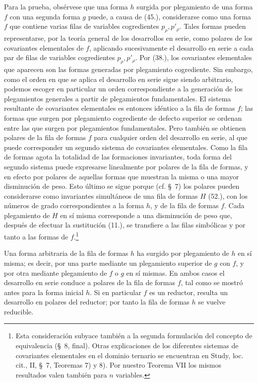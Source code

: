 \documentclass[11pt]{article}
\begin{document}
Para la prueba, obsérvese que una forma $h$ surgida por plegamiento de una forma $f$ con una segunda forma $g$ puede, a causa de (45.), considerarse como una forma $f$ que contiene varias filas de variables cogredientes $p_\rho,p'_\rho$. Tales formas pueden representarse, por la teoría general de los desarrollos en serie, como polares de los covariantes elementales de $f$, aplicando sucesivamente el desarrollo en serie a cada par de filas de variables cogredientes $p_\rho,p'_\rho$. Por (38.), los covariantes elementales que aparecen son las formas generadas por plegamiento cogrediente. Sin embargo, como el orden en que se aplica el desarrollo en serie sigue siendo arbitrario, podemos escoger en particular un orden correspondiente a la generación de los plegamientos generales a partir de plegamientos fundamentales. El sistema resultante de covariantes elementales es entonces idéntico a la fila de formas $f$; las formas que surgen por plegamiento cogrediente de defecto superior se ordenan entre las que surgen por plegamientos fundamentales. Pero también se obtienen polares de la fila de formas $f$ para cualquier orden del desarrollo en serie, al que puede corresponder un segundo sistema de covariantes elementales. Como la fila de formas agota la totalidad de las formaciones invariantes, toda forma del segundo sistema puede expresarse linealmente por polares de la fila de formas, y en efecto por polares de aquellas formas que muestran la misma o una mayor disminución de peso. Esto último se sigue porque (cf. \S\ 7) los polares pueden considerarse como invariantes simultáneos de una fila de formas $H$ (52.), con los números de grado correspondientes a la forma $h$, y de la fila de formas $f$. Cada plegamiento de $H$ en sí misma corresponde a una disminución de peso que, después de efectuar la sustitución (11.), se transfiere a las filas simbólicas y por tanto a las formas de $f$.\footnote{Esta consideración subyace también a la segunda formulación del concepto de equivalencia (\S\ 8, final). Otras explicaciones de los diferentes sistemas de covariantes elementales en el dominio ternario se encuentran en Study, loc. cit., II, \S\ 7, Teoremas 7) y 8). Por nuestro Teorema VII los mismos resultados valen también para $n$ variables.}

Una forma arbitraria de la fila de formas $h$ ha surgido por plegamiento de $h$ en sí misma; es decir, por una parte mediante un plegamiento superior de $g$ con $f$, y por otra mediante plegamiento de $f$ o $g$ en sí mismas. En ambos casos el desarrollo en serie conduce a polares de la fila de formas $f$, tal como se mostró antes para la forma inicial $h$. Si en particular $f$ es un reductor, resulta un desarrollo en polares del reductor; por tanto la fila de formas $h$ se vuelve reducible.
\end{document}
